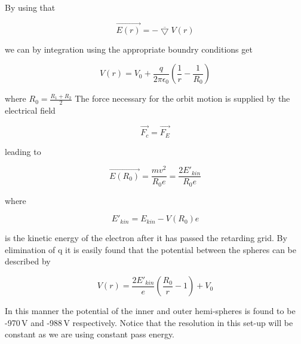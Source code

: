 By using that

\begin{equation}
\vec{E(r)}=-\overline{\bigtriangledown}V(r)
\end{equation}

we can by integration using the appropriate boundry conditions get

\begin{equation}
V(r)=V_{0} + \frac{q}{2\pi \epsilon_{0}}(\frac{1}{r}-\frac{1}{R_{0}})
\end{equation}

where $R_{0}=\frac{R_{1}+R_{2}}{2}$ The force necessary for the orbit motion is supplied by the electrical field

\begin{equation}
\vec{F_{c}}=\vec{F_{E}}
\end{equation}

leading to

\begin{equation}
\vec{E(R_{0})}=\frac{mv^{2}}{R_{0}e}=\frac{2E'_{kin}}{R_{0}e}
\end{equation}

where

\begin{equation}
E'_{kin}=E_{kin}-V(R_{0})e
\end{equation}

is the kinetic energy of the electron after it has passed the retarding grid. By elimination of q it is easily found that the potential between the spheres can be described by

\begin{equation}
V(r)=\frac{2E'_{kin}}{e}(\frac{R_{0}}{r}-1)+V_{0}
\end{equation}

In this manner the potential of the inner and outer hemi-spheres is found to be -970\,V and -988\,V respectively. Notice that the resolution in this set-up will be constant as we are using constant pass energy.


